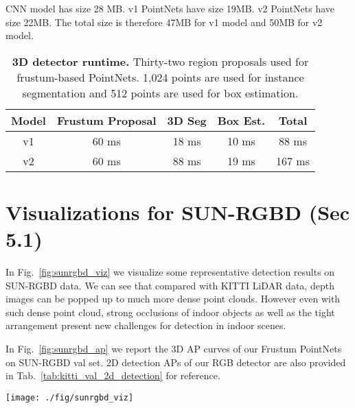 \documentclass[10pt,twocolumn,letterpaper]{article}
\begin{document}
CNN model has size 28 MB. v1 PointNets have size 19MB. v2 PointNets have size 22MB. The total size is therefore 47MB for v1 model and 50MB for v2 model.

\begin{table}[h!]
\small
\centering
\begin{tabular}{c|ccc|c}
\hline
Model & Frustum Proposal & 3D Seg &  Box Est. & Total \\ \hline
v1 & 60 ms & 18 ms & 10 ms & 88 ms \\ 
v2 & 60 ms & 88 ms & 19 ms & 167 ms \\ \hline
\end{tabular}
\caption{\textbf{3D detector runtime.} Thirty-two region proposals used for frustum-based PointNets. 1,024 points are used for instance segmentation and 512 points are used for box estimation.}
\label{tab:runtime}
\end{table}

\section{Visualizations for SUN-RGBD (Sec 5.1)}
\label{sec:supp_viz}

In Fig.~\ref{fig:sunrgbd_viz} we visualize some representative detection results on SUN-RGBD data. We can see that compared with KITTI LiDAR data, depth images can be popped up to much more dense point clouds. However even with such dense point cloud, strong occlusions of indoor objects as well as the tight arrangement present new challenges for detection in indoor scenes.

In Fig.~\ref{fig:sunrgbd_ap} we report the 3D AP curves of our Frustum PointNets on SUN-RGBD val set. 2D detection APs of our RGB detector are also provided in Tab.~\ref{tab:kitti_val_2d_detection} for reference. 



\begin{figure*}[t!]
    \centering
    \texttt{[image: ./fig/sunrgbd\_viz]}
    \caption{\textbf{Visualization of Frustum PointNets results on SUN-RGBD val set.} \emph{First row:} RGB image with 2D detection boxes. \emph{Second row:} point cloud popped up from depth map and predicted amodal 3D bounding boxes (the numbers beside boxes correspond to 2D boxes on images). Green boxes are true positive. Red boxes are false positives. False negatives are not visualized. \emph{Third row:} point cloud popped up from depth map and ground truth amodal 3D bounding boxes.}
    \label{fig:sunrgbd_viz}
\end{figure*}
\end{document}
